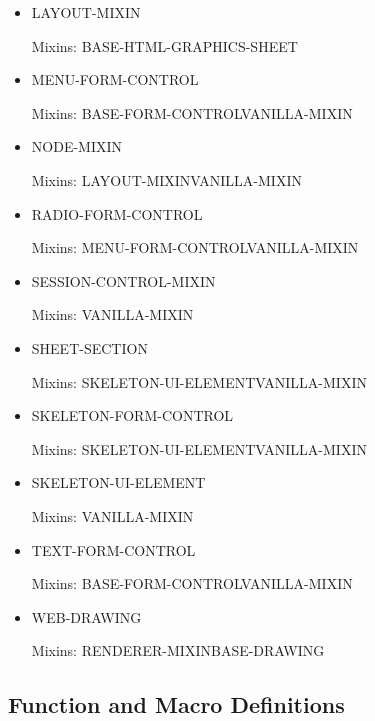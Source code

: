 \documentclass [11pt]{book}
\begin{document}
\begin{itemize}
\item {}LAYOUT-MIXIN

Mixins: BASE-HTML-GRAPHICS-SHEET



\item {}MENU-FORM-CONTROL

Mixins: BASE-FORM-CONTROLVANILLA-MIXIN



\item {}NODE-MIXIN

Mixins: LAYOUT-MIXINVANILLA-MIXIN



\item {}RADIO-FORM-CONTROL

Mixins: MENU-FORM-CONTROLVANILLA-MIXIN



\item {}SESSION-CONTROL-MIXIN

Mixins: VANILLA-MIXIN



\item {}SHEET-SECTION

Mixins: SKELETON-UI-ELEMENTVANILLA-MIXIN



\item {}SKELETON-FORM-CONTROL

Mixins: SKELETON-UI-ELEMENTVANILLA-MIXIN



\item {}SKELETON-UI-ELEMENT

Mixins: VANILLA-MIXIN



\item {}TEXT-FORM-CONTROL

Mixins: BASE-FORM-CONTROLVANILLA-MIXIN



\item {}WEB-DRAWING

Mixins: RENDERER-MIXINBASE-DRAWING



\end{itemize}



\subsection{Function and Macro Definitions}
\end{document}
